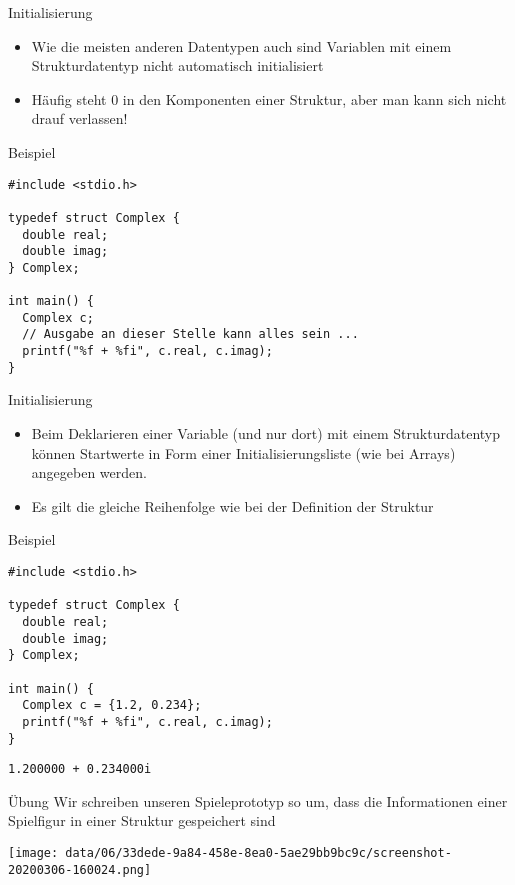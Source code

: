 \documentclass[presentation]{beamer}
\begin{document}
\begin{frame}[label={sec:orgd1c0a19},fragile]{Initialisierung}
 \begin{itemize}
\item Wie die meisten anderen Datentypen auch sind Variablen mit einem
Strukturdatentyp nicht automatisch initialisiert
\item Häufig steht 0 in den Komponenten einer Struktur, aber \alert{man kann
sich nicht drauf verlassen}!
\end{itemize}
\begin{exampleblock}{Beispiel}
\begin{verbatim}
#include <stdio.h>

typedef struct Complex {
  double real;
  double imag;
} Complex;

int main() {
  Complex c;
  // Ausgabe an dieser Stelle kann alles sein ...
  printf("%f + %fi", c.real, c.imag);
}
\end{verbatim}
\end{exampleblock}
\end{frame}
\begin{frame}[label={sec:org1407139},fragile]{Initialisierung}
 \begin{itemize}
\item Beim Deklarieren einer Variable (\alert{und nur dort}) mit einem
Strukturdatentyp können Startwerte in Form einer
\alert{Initialisierungsliste} (wie bei Arrays) angegeben werden.
\item Es gilt die \alert{gleiche Reihenfolge} wie bei der Definition der
Struktur
\end{itemize}
\begin{exampleblock}{Beispiel}
\begin{verbatim}
#include <stdio.h>

typedef struct Complex {
  double real;
  double imag;
} Complex;

int main() {
  Complex c = {1.2, 0.234};
  printf("%f + %fi", c.real, c.imag);
}
\end{verbatim}

\begin{verbatim}
1.200000 + 0.234000i
\end{verbatim}
\end{exampleblock}
\end{frame}
\begin{frame}[label={sec:org5909de1}]{Übung}
Wir schreiben unseren Spieleprototyp so um, dass die Informationen
einer Spielfigur in einer Struktur gespeichert sind
\begin{center}
\texttt{[image: data/06/33dede-9a84-458e-8ea0-5ae29bb9bc9c/screenshot-20200306-160024.png]}
\end{center}
\end{frame}
\end{document}
